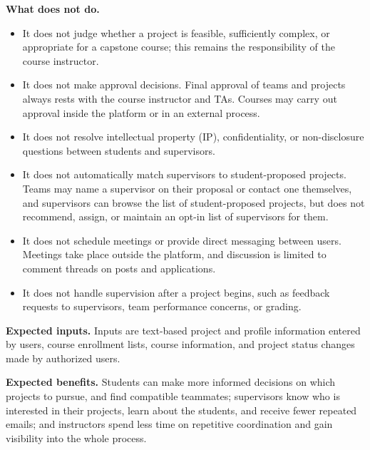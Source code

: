 \documentclass[12pt]{article}
\newcounter{tin}
\begin{document}
  \textbf{What \projname{} does not do.}
  \begin{itemize}
    \item It does not judge whether a project is feasible, sufficiently complex, or appropriate
    for a capstone course; this remains the responsibility of the course instructor.
    \item It does not make approval decisions. Final approval of teams and projects always rests
    with the course instructor and TAs. Courses may carry out approval inside the platform or in an external process.
    \item It does not resolve intellectual property (IP), confidentiality, or non-disclosure
    questions between students and supervisors.
    \item It does not automatically match supervisors to student-proposed projects. Teams may name a
    supervisor on their proposal or contact one themselves, and supervisors can browse the list of
    student-proposed projects, but \projname{} does not recommend, assign, or maintain an opt-in list
    of supervisors for them.
    \item It does not schedule meetings or provide direct messaging between users. Meetings take place
    outside the platform, and discussion is limited to comment threads on posts and applications.
    \item It does not handle supervision after a project begins, such as feedback requests to
    supervisors, team performance concerns, or grading.
  \end{itemize}

  \textbf{Expected inputs.} Inputs are text-based project and profile information entered by users,
  course enrollment lists, course information, and project status changes made by authorized users.

  \textbf{Expected benefits.} Students can make more informed decisions on which projects to pursue,
  and find compatible teammates; supervisors know who is interested in their projects,
  learn about the students, and receive fewer repeated emails; and instructors spend less time on repetitive
  coordination and gain visibility into the whole process.
\end{document}
